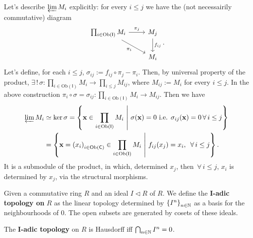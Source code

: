 \begin{ex}
	Let's describe $\varprojlim M_i$ explicitly: for every $i \leq j$ we have the (not necessairily commutative) diagram
	\begin{equation}
	\begin{tikzcd}
		\prod_{i \in \mathrm{Ob} \left(\mathsf{I}\right)} M_i \arrow[r, "\pi_j", rightarrow] \arrow[rd, "\pi_i"', rightarrow] &
		M_j \arrow[d, "f_{ij}", rightarrow] \\
		& M_i
	\end{tikzcd} 
	.\end{equation}
	Let's define, for each $i \leq j$, $\sigma_{ij} := f_{ij} \circ\pi_j - \pi_i$.
	Then, by universal property of the product,
	$\exists\, !\, \sigma: \prod_{i \in \mathrm{Ob} \left(\mathsf{I}\right)} M_i \to \prod_{i \leq j} M_{ij}$,
	where $M_{ij} := M_i$ for every $i \leq j$.
	In the above construction $\pi_i \circ\sigma = \sigma_{ij}: \prod_{i \in \mathrm{Ob} \left(\mathsf{I}\right)} M_i \to M_{ij}$.
	Then we have
	\begin{align}
		\varprojlim M_i &\simeq \ker \sigma =
		\left\{ \mathbf{x} \in \prod_{i \in \mathrm{Ob} \left(\mathsf{I}\right)}
			M_i \ \middle|\ \sigma(\mathbf{x}) = 0
		\text{ i.e. } \sigma_{ij}(\mathbf{x}) =0 \,\forall\, i \leq j \right\} \\
				&=
		\left\{ \mathbf{x} = \left( x_i \right)_{i \in \mathrm{Ob} \left(\mathsf{C}\right)} \in
		\prod_{i \in \mathrm{Ob} \left(\mathsf{I}\right)} M_i \ \middle|\ 
		f_{ij}(x_j) = x_i, \ \,\forall\, i \leq j \right\}
	.\end{align} 
	It is a submodule of the product, in which, determined $x_j$, then $\,\forall\, i \leq j$, $x_i$ is determined by $x_j$, via the structural morphisms.
\end{ex} 

\begin{defn}
	Given a commutative ring $R$ and an ideal $I \triangleleft R$ of $R$.
	We define the \textbf{$\mathbf{I}$-adic topology on} $R$ as the linear topology determined by
	$\left\{ I^n \right\}_{n \in \mathbb{N}}$ as a basis for the neighbourhoods of $0$.
	The open subsets are generated by cosets of these ideals.
\end{defn}

\begin{rem}
	The \textbf{$\mathbf{I}$-adic topology} on $R$ is Hausdorff iff $\bigcap_{n \in \mathbb{N}} I^n = 0$.
\end{rem} 

